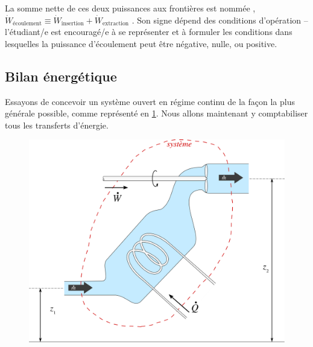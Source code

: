 		La somme nette de ces deux puissances aux frontières est nommée , $\dot{W}_\text{écoulement} \equiv \dot{W}_\text{insertion} + \dot{W}_\text{extraction}$ . Son signe dépend des conditions d’opération -- l’étudiant/e est encouragé/e à se représenter et à formuler les conditions dans lesquelles la puissance d’écoulement peut être négative, nulle, ou positive.


	\subsection{Bilan énergétique}

		Essayons de concevoir un système ouvert en régime continu de la façon la plus générale possible, comme représenté en \cref{fig_système_ouvert}. Nous allons maintenant y comptabiliser tous les transferts d’énergie.

		\begin{figure}
			\begin{center}
				\includegraphics[width=\textwidth]{images/sfee.png}
			\end{center}
			\label{fig_système_ouvert}
		\end{figure}

